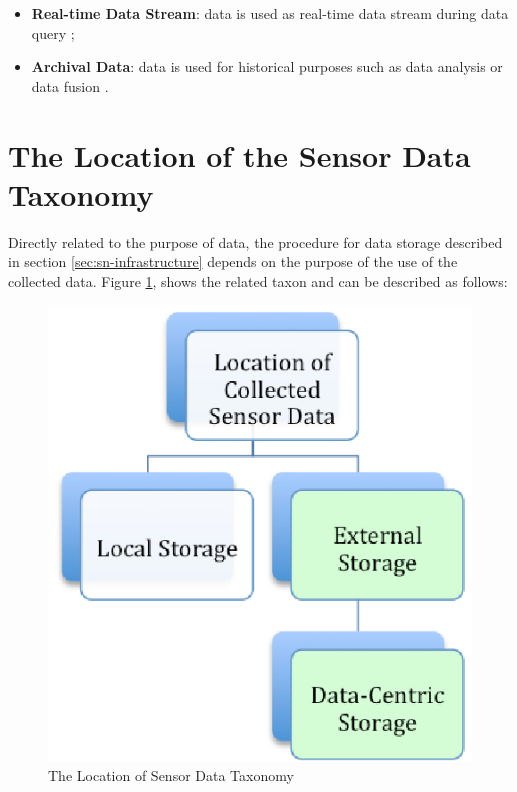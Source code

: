 \begin{itemize}
  \item \textbf{Real-time Data Stream}: data is used as real-time data stream
  during data query \cite{sn-intro01};
  \item \textbf{Archival Data}: data is used for historical purposes such as
  data analysis or data fusion \cite{sn-intro01, sn-intro02}.
\end{itemize}

\section{The Location of the Sensor Data Taxonomy}

Directly related to the purpose of data, the procedure for data storage
described in section \ref{sec:sn-infrastructure} depends on the purpose of the
use of the collected data. Figure \ref{fig:taxonomy-data-location}, shows the
related taxon and can be described as follows:

\begin{figure}[h]
  \centering
  \includegraphics{../diagrams/taxonomy-data-location}
  \caption{The Location of Sensor Data Taxonomy}
  \label{fig:taxonomy-data-location}
\end{figure}

